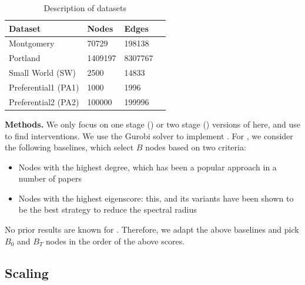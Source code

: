 \begin{table}[!h]
\centering
\begin{tabular}{llll}
\hline
 \textbf{Dataset} & \textbf{Nodes} & \textbf{Edges}   \\ \hline
 Montgomery & 70729 & 198138 \\
 Portland & 1409197 & 8307767 \\
 Small World (SW) & 2500 & 14833 \\   
 Preferential1 (PA1) & 1000 & 1996 \\ 
Preferential2 (PA2) & 100000 & 199996 \\ \hline
\end{tabular}
\caption{Description of datasets}
\label{tab:datasets}
\end{table}

\noindent
\textbf{Methods.}
We only focus on one stage (\probone) or two stage (\probtwo) versions of \prob{} here, and use \algo{} to find 
interventions. We use the Gurobi solver to implement \algo{}.
For \probone{}, we consider the following baselines, which select $B$ nodes based on two criteria:
\begin{itemize}
\item
Nodes with the highest degree, which has been a popular approach in a number of papers
\cite{salathe:plos12, Barabasi509}
\item
Nodes with the highest eigenscore: this, and its variants have been shown to be the best strategy to reduce the spectral radius
\cite{tong:cikm12,zhang2015controlling,YaoSDM2014,AAAI1816714,PreciadoVM13_2,PreciadoVM13,PreciadoVM14}
\end{itemize}

No prior results are known for \probtwo{}. Therefore, we adapt the above baselines and pick $B_0$ and $B_T$
nodes in the order of the above scores.


\subsection{Scaling}

